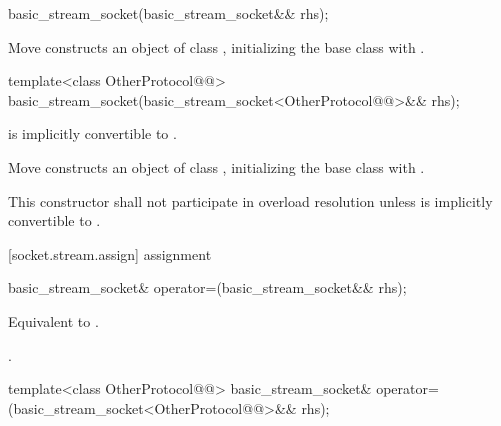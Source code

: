 \begin{itemdecl}
basic_stream_socket(basic_stream_socket&& rhs);
\end{itemdecl}

\begin{itemdescr}
\pnum
\effects Move constructs an object of class , initializing the base class with .
\end{itemdescr}

\begin{itemdecl}
template<class OtherProtocol@@>
  basic_stream_socket(basic_stream_socket<OtherProtocol@@>&& rhs);
\end{itemdecl}

\begin{itemdescr}
\pnum
\requires {} is implicitly convertible to .

\pnum
\effects Move constructs an object of class , initializing the base class with .

\pnum
\remarks This constructor shall not participate in overload resolution unless  is implicitly convertible to .
\end{itemdescr}



[socket.stream.assign]{ assignment}

\begin{itemdecl}
basic_stream_socket& operator=(basic_stream_socket&& rhs);
\end{itemdecl}

\begin{itemdescr}
\pnum
\effects Equivalent to .

\pnum
\returns {}.
\end{itemdescr}

\begin{itemdecl}
template<class OtherProtocol@@>
  basic_stream_socket& operator=(basic_stream_socket<OtherProtocol@@>&& rhs);
\end{itemdecl}

